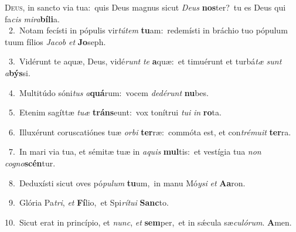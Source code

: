\lettrine{\initial\textcolor{\initialcolor}{D}}{eus,} in sancto via tua:~\dagger quis Deus magnus sicut \textit{De}\-\textit{us} \textbf{nos}\-ter?~\star tu es Deus qui fa\textit{cis} \textit{mi}\-\textit{ra}\textbf{bí}\textbf{li}a.\\
{\numbfont\textcolor{\numbcolor}{~2.}}~Notam fecísti in pópulis vir\-\textit{tú}\-\textit{tem} \textbf{tu}\-am:~\star redemísti in bráchio tuo pópulum tuum fílios \textit{Ja}\-\textit{cob} \textit{et} \textbf{Jo}\-seph.\par
{\numbfont\textcolor{\numbcolor}{~3.}}~Vidérunt te aquæ, Deus, vidé\textit{runt} \textit{te} \textbf{a}\-quæ:~\star et timuérunt et turbá\textit{tæ} \textit{sunt} \textit{a}\-\textbf{býs}si.\par
{\numbfont\textcolor{\numbcolor}{~4.}}~Multitúdo sóni\textit{tus} \textit{a}\-\textbf{quá}rum:~\star vocem \textit{de}\-\textit{dé}\textit{runt} \textbf{nu}\-bes.\par
{\numbfont\textcolor{\numbcolor}{~5.}}~Etenim sagíttæ \textit{tu}\-\textit{æ} \textbf{tráns}\-eunt:~\star vox tonítrui \textit{tu}\-\textit{i} \textit{in} \textbf{ro}\-ta.\par
{\numbfont\textcolor{\numbcolor}{~6.}}~Illuxérunt coruscatiónes tuæ \textit{or}\-\textit{bi} \textbf{ter}\-ræ:~\star commóta est, et con\-\textit{tré}\-\textit{mu}\textit{it} \textbf{ter}\-ra.\par
{\numbfont\textcolor{\numbcolor}{~7.}}~In mari via tua, et sémitæ tuæ in \textit{a}\-\textit{quis} \textbf{mul}\-tis:~\star et vestígia tua \textit{non} \textit{co}\-\textit{gno}\textbf{scén}tur.\par
{\numbfont\textcolor{\numbcolor}{~8.}}~Deduxísti sicut oves pó\-\textit{pu}\-\textit{lum} \textbf{tu}\-um,~\star in manu Mó\-\textit{y}\-\textit{si} \textit{et} \textbf{A}\-\textbf{a}ron.\par
{\numbfont\textcolor{\numbcolor}{~9.}}~Glória Pa\-\textit{tri}\-, \textit{et} \textbf{Fí}\-lio,~\star et Spi\-\textit{rí}\-\textit{tu}\textit{i} \textbf{Sanc}\-to.\par
{\numbfont\textcolor{\numbcolor}{10.}}~Sicut erat in princípio, et \textit{nunc}\-, \textit{et} \textbf{sem}\-per,~\star et in sǽcula sæ\-\textit{cu}\-\textit{ló}\textit{rum}. \textbf{A}\-men.\par
